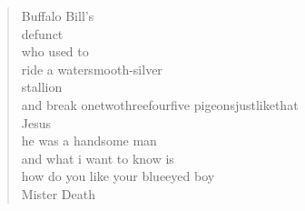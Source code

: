 
\vspace*{\fill}
\begin{verse}
Buffalo Bill's\\
defunct\\
\hspace*{4em}who used to\\
\hspace*{4em}ride a watersmooth-silver\\
\hspace*{14em}stallion\\
and break onetwothreefourfive pigeonsjustlikethat\\
\hspace*{25em}Jesus\\
he was a handsome man\\
\hspace*{14em}and what i want to know is\\
how do you like your blueeyed boy\\
Mister Death\\

\end{verse}
\vspace*{10em}
\vspace*{\fill}
\clearpage
